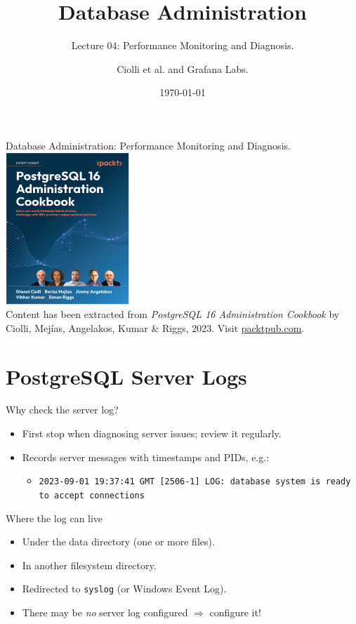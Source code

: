 \documentclass[aspectratio=169]{beamer}
\title[Monitoring]{Database Administration}
\subtitle{Lecture 04: Performance Monitoring and Diagnosis.}
\author{Ciolli et al. and Grafana Labs.}
\date{\today}
\begin{document}
\frame{\titlepage}

\begin{frame}{Database Administration: Performance Monitoring and Diagnosis.}
    \centering
    \includegraphics[width=0.35\textwidth]{figures/book_cover4}\\
    \vspace{2mm}
    {
        \scriptsize
        Content has been extracted from \textit{PostgreSQL 16 Administration Cookbook} by Ciolli, Mejías, Angelakos, Kumar \& Riggs, 2023. Visit \href{https://www.packtpub.com/en-us/product/postgresql-16-administration-cookbook-9781835468449}{packtpub.com}.
    }
\end{frame}

\section{PostgreSQL Server Logs}

\begin{frame}{Why check the server log?}
  \begin{itemize}
    \item First stop when diagnosing server issues; review it regularly.
    \item Records server messages with timestamps and PIDs, e.g.:
    \begin{itemize}
        \item \texttt{2023-09-01 19:37:41 GMT [2506-1] LOG: database system is ready to accept connections}
    \end{itemize}
  \end{itemize}
\end{frame}

\begin{frame}{Where the log can live}
  \begin{itemize}
    \item Under the data directory (one or more files).
    \item In another filesystem directory.
    \item Redirected to \texttt{syslog} (or Windows Event Log).
    \item There may be \emph{no} server log configured $\Rightarrow$ configure it!
  \end{itemize}
\end{frame}
\end{document}
